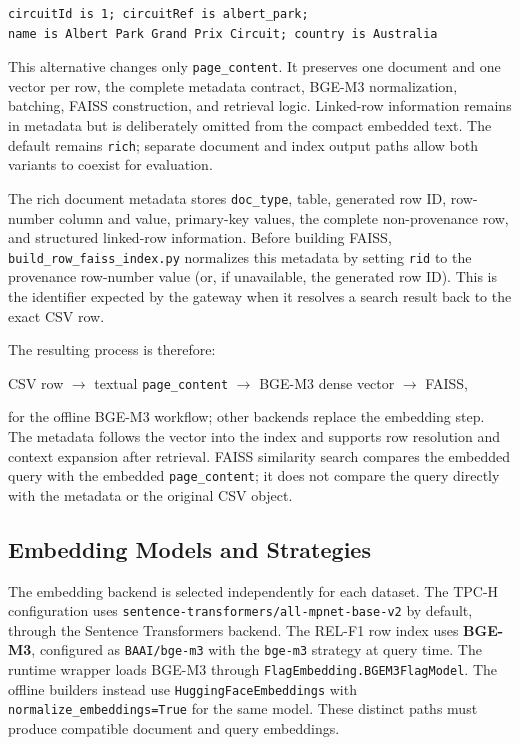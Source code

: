 \documentclass[11pt,a4paper]{article}
\newcommand{\code}[1]{\texttt{#1}}
\begin{document}
\begin{lstlisting}[style=codestyle]
circuitId is 1; circuitRef is albert_park;
name is Albert Park Grand Prix Circuit; country is Australia
\end{lstlisting}

This alternative changes only \code{page\_content}. It preserves one document
and one vector per row, the complete metadata contract, BGE-M3 normalization,
batching, FAISS construction, and retrieval logic. Linked-row information
remains in metadata but is deliberately omitted from the compact embedded text.
The default remains \code{rich}; separate document and index output paths allow
both variants to coexist for evaluation.

The rich document metadata stores \code{doc\_type}, table, generated row ID,
row-number column and value, primary-key values, the complete non-provenance row,
and structured linked-row information. Before building FAISS,
\code{build\_row\_faiss\_index.py} normalizes this metadata by setting
\code{rid} to the provenance row-number value (or, if unavailable, the generated
row ID). This is the identifier expected by the gateway when it resolves a search
result back to the exact CSV row.

The resulting process is therefore:

\begin{center}
CSV row $\longrightarrow$ textual \code{page\_content}
$\longrightarrow$ BGE-M3 dense vector $\longrightarrow$ FAISS,
\end{center}

for the offline BGE-M3 workflow; other backends replace the embedding step.
The metadata follows the vector into the index and supports row resolution and
context expansion after retrieval. FAISS similarity search compares the embedded query with the embedded
\code{page\_content}; it does not compare the query directly with the metadata or
the original CSV object.

\subsection{Embedding Models and Strategies}

The embedding backend is selected independently for each dataset. The TPC-H
configuration uses \code{sentence-transformers/all-mpnet-base-v2} by default,
through the Sentence Transformers backend. The REL-F1 row index uses
\textbf{BGE-M3}, configured as \code{BAAI/bge-m3} with the \code{bge-m3}
strategy at query time. The runtime wrapper loads BGE-M3 through
\code{FlagEmbedding.BGEM3FlagModel}. The offline builders instead use
\code{HuggingFaceEmbeddings} with \code{normalize\_embeddings=True} for the
same model. These distinct paths must produce compatible document and query
embeddings.
\end{document}

